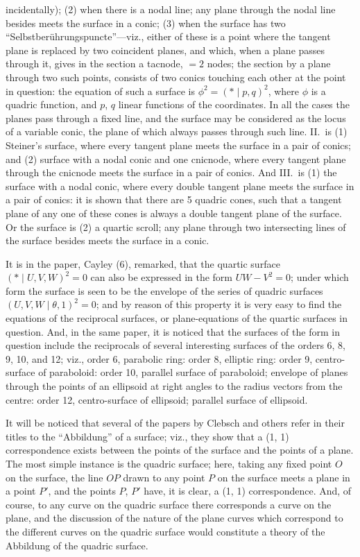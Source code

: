 \documentclass[11pt]{article}
\begin{document}
incidentally); (2) when there is a nodal line; any plane through the nodal line besides
meets the surface in a conic; (3) when the surface has two ``Selbstber\"uhrungspuncte''---viz.,
either of these is a point where the tangent plane is replaced by two coincident
planes, and which, when a plane passes through it, gives in the section a tacnode,
$= 2$ nodes; the section by a plane through two such points, consists of two conics
touching each other at the point in question: the equation of such a surface is
$\phi^2 = (*\mid p, q)^2$, where $\phi$ is a quadric function, and $p$, $q$ linear functions of the coordinates.
In all the cases the planes pass through a fixed line, and the surface may be con\-sidered
as the locus of a variable conic, the plane of which always passes through
such line. II.\ is (1) Steiner's surface, where every tangent plane meets the surface
in a pair of conics; and (2) surface with a nodal conic and one cnicnode, where every
tangent plane through the cnicnode meets the surface in a pair of conics. And
III.\ is (1) the surface with a nodal conic, where every double tangent plane meets
the surface in a pair of conics: it is shown that there are 5 quadric cones, such that
a tangent plane of any one of these cones is always a double tangent plane of the
surface. Or the surface is (2) a quartic scroll; any plane through two intersecting lines
of the surface besides meets the surface in a conic.

It is in the paper, Cayley (6), remarked, that the quartic surface $(* \mid U, V, W)^2 = 0$
can also be expressed in the form $UW - V^2 = 0$; under which form the surface is
seen to be the envelope of the series of quadric surfaces $(U, V, W \mid \theta, 1)^2 = 0$; and
by reason of this property it is very easy to find the equations of the reciprocal
surfaces, or plane-equations of the quartic surfaces in question. And, in the same paper,
it is noticed that the surfaces of the form in question include the reciprocals of
several interesting surfaces of the orders 6, 8, 9, 10, and 12; viz., order 6, parabolic
ring: order 8, elliptic ring: order 9, centro-surface of paraboloid: order 10, parallel
surface of paraboloid; envelope of planes through the points of an ellipsoid at right
angles to the radius vectors from the centre: order 12, centro-surface of ellipsoid;
parallel surface of ellipsoid.

It will be noticed that several of the papers by Clebsch and others refer in their
titles to the ``Abbildung'' of a surface; viz., they show that a (1, 1) correspondence
exists between the points of the surface and the points of a plane. The most simple
instance is the quadric surface; here, taking any fixed point $O$ on the surface, the
line $OP$ drawn to any point $P$ on the surface meets a plane in a point $P'$, and the
points $P$, $P'$ have, it is clear, a (1, 1) correspondence. And, of course, to any curve
on the quadric surface there corresponds a curve on the plane, and the discussion of
the nature of the plane curves which correspond to the different curves on the quadric
surface would constitute a theory of the Abbildung of the quadric surface.
\end{document}
